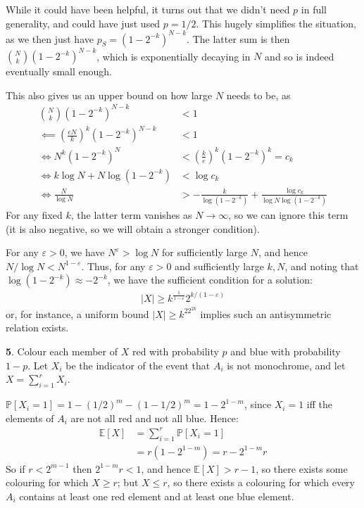 \documentclass[]{article}
\theoremstyle{custhm}
\theoremstyle{cusdef}
\theoremstyle{custhm}
\theoremstyle{custhm}
\theoremstyle{custhm}
\theoremstyle{custhm}
\theoremstyle{cusdef}
\theoremstyle{remark}
\newcommand{\ra}{\rightarrow}
\newcommand{\eps}{\varepsilon}
\newcommand{\E}{\mathbb{E}}
\renewcommand{\P}{\mathbb{P}}
\begin{document}
While it could have been helpful, it turns out that we didn't need $p$ in full generality, and could have just used $p = 1/2$. This hugely simplifies the situation, as we then just have $p_S = (1-2^{-k})^{N-k}$. The latter sum is then $\binom{N}{k}(1-2^{-k})^{N-k}$, which is exponentially decaying in $N$ and so is indeed eventually small enough.

This also gives us an upper bound on how large $N$ needs to be, as
\begin{align*}
\binom{N}{k}(1-2^{-k})^{N-k}&<1\\
\impliedby \left(\frac{eN}{k}\right)^k\left(1-2^{-k}\right)^{N-k} &<1\\
\iff N^k(1-2^{-k})^N &< \left(\frac{k}{e}\right)^k(1-2^{-k})^k = c_k\\
\iff k\log N + N\log(1-2^{-k}) &< \log c_k\\
\iff \frac{N}{\log N} &> -\frac{k}{\log(1-2^{-k})} + \frac{\log c_k}{\log N\log (1-2^{-k})}
\end{align*}
For any fixed $k$, the latter term vanishes as $N\ra \infty$, so we can ignore this term (it is also negative, so we will obtain a stronger condition).

For any $\eps > 0$, we have $N^\eps > \log N$ for sufficiently large $N$, and hence $N/\log N < N^{1-\eps}$. Thus, for any $\eps > 0$ and sufficiently large $k,N$, and noting that $\log(1-2^{-k})\approx -2^{-k}$, we have the sufficient condition for a solution:
\begin{align*}
|X| \ge k^{\frac{1}{1-\eps}}2^{k/(1-\eps)}
\end{align*}
or, for instance, a uniform bound $|X|\ge k^22^{2k}$ implies such an antisymmetric relation exists.

\textbf{5}. Colour each member of $X$ red with probability $p$ and blue with probability $1-p$. Let $X_i$ be the indicator of the event that $A_i$ is not monochrome, and let $X = \sum_{i=1}^{r}X_i$.

$\P[X_i = 1] = 1 - (1/2)^m - (1-1/2)^m = 1 - 2^{1-m}$, since $X_i = 1$ iff the elements of $A_i$ are not all red and not all blue. Hence:
\begin{align*}
\E[X] &= \sum_{i=1}^{r} \P[X_i = 1]\\
&= r(1-2^{1-m}) = r - 2^{1-m}r
\end{align*}
So if $r < 2^{m-1}$ then $2^{1-m}r < 1$, and hence $\E[X] > r -1$, so there exists some colouring for which $X \ge r$; but $X \le r$, so there exists a colouring for which every $A_i$ contains at least one red element and at least one blue element.
\end{document}

